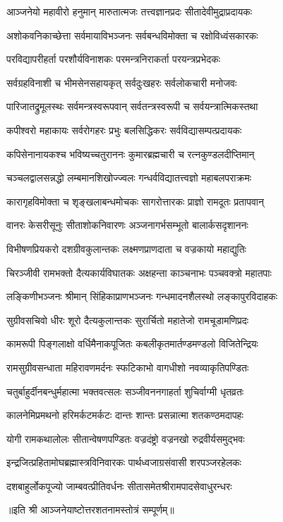 

\twolineshloka
{आञ्जनेयो महावीरो हनुमान् मारुतात्मजः}
{तत्त्वज्ञानप्रदः सीतादेवीमुद्राप्रदायकः}

\twolineshloka
{अशोकवनिकाच्छेत्ता सर्वमायाविभञ्जनः}
{सर्वबन्धविमोक्ता च रक्षोविध्वंसकारकः}

\twolineshloka
{परविद्यापरीहर्ता परशौर्यविनाशकः}
{परमन्त्रनिराकर्ता परयन्त्रप्रभेदकः}

\twolineshloka
{सर्वग्रहविनाशी च भीमसेनसहायकृत्}
{सर्वदुःखहरः सर्वलोकचारी मनोजवः}

\twolineshloka
{पारिजातद्रुमूलस्थः सर्वमन्त्रस्वरूपवान्}
{सर्वतन्त्रस्वरूपी च सर्वयन्त्रात्मिकस्तथा}

\twolineshloka
{कपीश्वरो महाकायः सर्वरोगहरः प्रभुः}
{बलसिद्धिकरः सर्वविद्यासम्पत्प्रदायकः}

\twolineshloka
{कपिसेनानायकश्च भविष्यच्चतुराननः}
{कुमारब्रह्मचारी च रत्नकुण्डलदीप्तिमान्}

\twolineshloka
{चञ्चलद्वालसन्नद्धो लम्बमानशिखोज्ज्वलः}
{गन्धर्वविद्यातत्त्वज्ञो महाबलपराक्रमः}

\twolineshloka
{कारागृहविमोक्ता च शृङ्खलाबन्धमोचकः}
{सागरोत्तारकः प्राज्ञो रामदूतः प्रतापवान्}

\twolineshloka
{वानरः केसरीसूनुः सीताशोकनिवारणः}
{अञ्जनागर्भसम्भूतो बालार्कसदृशाननः}

\twolineshloka
{विभीषणप्रियकरो दशग्रीवकुलान्तकः}
{लक्ष्मणप्राणदाता च वज्रकायो महाद्युतिः}

\twolineshloka
{चिरञ्जीवी रामभक्तो दैत्यकार्यविघातकः}
{अक्षहन्ता काञ्चनाभः पञ्चवक्त्रो महातपाः}

\twolineshloka
{लङ्किणीभञ्जनः श्रीमान् सिंहिकाप्राणभञ्जनः}
{गन्धमादनशैलस्थो लङ्कापुरविदाहकः}

\twolineshloka
{सुग्रीवसचिवो धीरः शूरो दैत्यकुलान्तकः}
{सुरार्चितो महातेजो रामचूडामणिप्रदः}

\twolineshloka
{कामरूपी पिङ्गलाक्षो वर्धिमैनाकपूजितः}
{कबलीकृतमार्तण्डमण्डलो विजितेन्द्रियः}

\twolineshloka
{रामसुग्रीवसन्धाता महिरावणमर्दनः}
{स्फटिकाभो वागधीशो नवव्याकृतिपण्डितः}

\twolineshloka
{चतुर्बाहुर्दीनबन्धुर्महात्मा भक्तवत्सलः}
{सञ्जीवननगाहर्ता शुचिर्वाग्मी धृतव्रतः}

\twolineshloka
{कालनेमिप्रमथनो हरिमर्कटमर्कटः}
{दान्तः शान्तः प्रसन्नात्मा शतकण्ठमदापहः}

\twolineshloka
{योगी रामकथालोलः सीतान्वेषणपण्डितः}
{वज्रदंष्ट्रो वज्रनखो रुद्रवीर्यसमुद्भवः}

\twolineshloka
{इन्द्रजित्प्रहितामोघब्रह्मास्त्रविनिवारकः}
{पार्थध्वजाग्रसंवासी शरपञ्जरहेलकः}

\twolineshloka
{दशबाहुर्लोकपूज्यो जाम्बवत्प्रीतिवर्धनः}
{सीतासमेतश्रीरामपादसेवाधुरन्धरः}

{॥इति श्री आञ्जनेयाष्टोत्तरशतनामस्तोत्रं सम्पूर्णम्॥}

